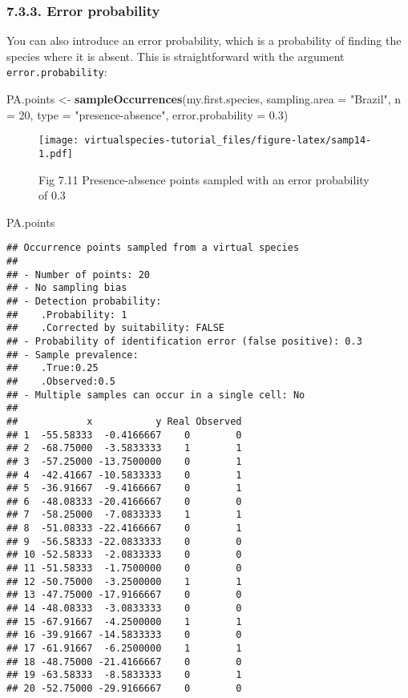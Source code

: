 \documentclass[]{article}
\newenvironment{Shaded}{\begin{snugshade}}{\end{snugshade}}
\newcommand{\KeywordTok}[1]{\textcolor[rgb]{0.13,0.29,0.53}{\textbf{#1}}}
\newcommand{\DataTypeTok}[1]{\textcolor[rgb]{0.13,0.29,0.53}{#1}}
\newcommand{\DecValTok}[1]{\textcolor[rgb]{0.00,0.00,0.81}{#1}}
\newcommand{\FloatTok}[1]{\textcolor[rgb]{0.00,0.00,0.81}{#1}}
\newcommand{\StringTok}[1]{\textcolor[rgb]{0.31,0.60,0.02}{#1}}
\newcommand{\NormalTok}[1]{#1}
\begin{document}
\subsubsection{7.3.3. Error probability}\label{error-probability}

You can also introduce an error probability, which is a probability of
finding the species where it is absent. This is straightforward with the
argument \texttt{error.probability}:

\begin{Shaded}
\begin{Highlighting}[]
\NormalTok{PA.points <-}\StringTok{ }\KeywordTok{sampleOccurrences}\NormalTok{(my.first.species,}
                               \DataTypeTok{sampling.area =} \StringTok{"Brazil"}\NormalTok{,}
                               \DataTypeTok{n =} \DecValTok{20}\NormalTok{,}
                               \DataTypeTok{type =} \StringTok{"presence-absence"}\NormalTok{,}
                               \DataTypeTok{error.probability =} \FloatTok{0.3}\NormalTok{)}
\end{Highlighting}
\end{Shaded}

\begin{figure}
\centering
\texttt{[image: virtualspecies-tutorial\_files/figure-latex/samp14-1.pdf]}
\caption{Fig 7.11 Presence-absence points sampled with an error
probability of 0.3}
\end{figure}

\begin{Shaded}
\begin{Highlighting}[]
\NormalTok{PA.points}
\end{Highlighting}
\end{Shaded}

\begin{verbatim}
## Occurrence points sampled from a virtual species
## 
## - Number of points: 20
## - No sampling bias
## - Detection probability: 
##    .Probability: 1
##    .Corrected by suitability: FALSE
## - Probability of identification error (false positive): 0.3
## - Sample prevalence: 
##    .True:0.25
##    .Observed:0.5
## - Multiple samples can occur in a single cell: No
## 
##            x           y Real Observed
## 1  -55.58333  -0.4166667    0        0
## 2  -68.75000  -3.5833333    1        1
## 3  -57.25000 -13.7500000    0        1
## 4  -42.41667 -10.5833333    0        1
## 5  -36.91667  -9.4166667    0        1
## 6  -48.08333 -20.4166667    0        0
## 7  -58.25000  -7.0833333    1        1
## 8  -51.08333 -22.4166667    0        1
## 9  -56.58333 -22.0833333    0        0
## 10 -52.58333  -2.0833333    0        0
## 11 -51.58333  -1.7500000    0        0
## 12 -50.75000  -3.2500000    1        1
## 13 -47.75000 -17.9166667    0        0
## 14 -48.08333  -3.0833333    0        0
## 15 -67.91667  -4.2500000    1        1
## 16 -39.91667 -14.5833333    0        0
## 17 -61.91667  -6.2500000    1        1
## 18 -48.75000 -21.4166667    0        0
## 19 -63.58333  -8.5833333    0        1
## 20 -52.75000 -29.9166667    0        0
\end{verbatim}
\end{document}

